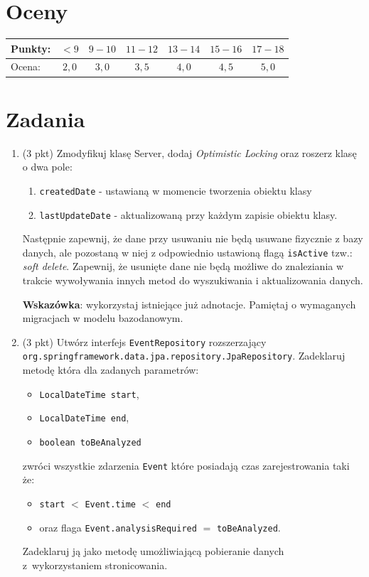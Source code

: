 \documentclass[12pt]{article}
\begin{document}
    \section*{Oceny}
    \begin{tabular}{|l|c|c|c|c|c|c|}
        \hline
        Punkty: & $<9$ & $9-10$ & $11-12$ & $13-14$ & $15-16$ & $17-18$\\
        \hline
        Ocena:  & $2,0$ & $3,0$ & $3,5$ & $4,0$ & $4,5$ & $5,0$\\
        \hline
    \end{tabular}

    \section*{Zadania}
    \begin{enumerate}
        \item
        (3 pkt) Zmodyfikuj klasę Server, dodaj \emph{Optimistic Locking} oraz roszerz klasę o dwa pole:
        \begin{enumerate}
            \item \texttt{createdDate} - ustawianą w momencie tworzenia obiektu klasy
            \item \texttt{lastUpdateDate} - aktualizowaną przy każdym zapisie obiektu klasy.
        \end{enumerate}
        Następnie zapewnij, że dane przy usuwaniu nie będą usuwane fizycznie z bazy danych, ale pozostaną w niej z odpowiednio ustawioną flagą \texttt{isActive} tzw.: \emph{soft delete}. Zapewnij, że usunięte dane nie będą możliwe do znaleziania w trakcie wywoływania innych metod do wyszukiwania i aktualizowania danych.

        \textbf{Wskazówka}: wykorzystaj istniejące już adnotacje. Pamiętaj o wymaganych migracjach w modelu bazodanowym.

        \item
            (3 pkt) Utwórz interfejs \texttt{EventRepository} rozszerzający \texttt{org\allowbreak .spring\-frame\-work\allowbreak .data\allowbreak .jpa\allowbreak .re\-po\-si\-to\-ry.Jpa\-Repo\-si\-tory}. Zadeklaruj metodę która dla zadanych parametrów:
            \begin{itemize}
                \item \texttt{Local\-Date\-Time start},
                \item \texttt{Local\-Date\-Time end},
                \item \texttt{boolean toBeAnalyzed}
            \end{itemize}  zwróci wszystkie zdarzenia \texttt{Event} które posiadają czas zarejestrowania taki że:
            \begin{itemize}
                \item \texttt{start} $<$ \texttt{Event.time} $<$ \texttt{end}
                \item oraz flaga \texttt{Event.analysisRequired} $=$ \texttt{toBeAnalyzed}.
            \end{itemize}Zadeklaruj ją jako metodę umożliwiającą pobieranie danych z~wykorzystaniem stronicowania.


\end{enumerate}
\end{document}
